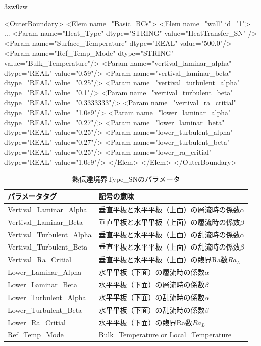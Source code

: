\begin{indentation}{3zw}{0zw}
{\small
\begin{program}
<OuterBoundary>
  <Elem name="Basic_BCs">
    <Elem name="wall" id="1">
      ...
      <Param name="Heat_Type"                dtype="STRING" value="HeatTransfer_SN" />
      <Param name="Surface_Temperature"      dtype="REAL"   value="500.0"/>
      <Param name="Ref_Temp_Mode"            dtype="STRING" value="Bulk_Temperature"/>
      <Param name="vertival_laminar_alpha"   dtype="REAL"   value="0.59"/>
      <Param name="vertival_laminar_beta"    dtype="REAL"   value="0.25"/>
      <Param name="vertival_turbulent_alpha" dtype="REAL"   value="0.1"/>
      <Param name="vertival_turbulent_beta"  dtype="REAL"   value="0.3333333"/>
      <Param name="vertival_ra_critial"      dtype="REAL"   value="1.0e9"/>
      <Param name="lower_laminar_alpha"      dtype="REAL"   value="0.27"/>
      <Param name="lower_laminar_beta"       dtype="REAL"   value="0.25"/>
      <Param name="lower_turbulent_alpha"    dtype="REAL"   value="0.27"/>
      <Param name="lower_turbulent_beta"     dtype="REAL"   value="0.25"/>
      <Param name="lower_ra_critial"         dtype="REAL"   value="1.0e9"/>
    </Elem>
  </Elem>
</OuterBoundary>
\end{program}
}

\begin{table}[htdp]
\caption{熱伝達境界Type\_SNのパラメータ}
\begin{center}
\small
\begin{tabular}{ll}\toprule
パラメータタグ & 記号の意味\\ \midrule
Vertival\_Laminar\_Alpha & 垂直平板と水平平板（上面）の層流時の係数$\alpha$\\
Vertival\_Laminar\_Beta & 垂直平板と水平平板（上面）の層流時の係数$\beta$\\
Vertival\_Turbulent\_Alpha & 垂直平板と水平平板（上面）の乱流時の係数$\alpha$\\
Vertival\_Turbulent\_Beta & 垂直平板と水平平板（上面）の乱流時の係数$\beta$\\
Vertival\_Ra\_Critial & 垂直平板と水平平板（上面）の臨界Ra数$Ra_L$\\
Lower\_Laminar\_Alpha & 水平平板（下面）の層流時の係数$\alpha$\\
Lower\_Laminar\_Beta & 水平平板（下面）の層流時の係数$\beta$\\
Lower\_Turbulent\_Alpha & 水平平板（下面）の乱流時の係数$\alpha$\\
Lower\_Turbulent\_Beta & 水平平板（下面）の乱流時の係数$\beta$\\
Lower\_Ra\_Critial & 水平平板（下面）の臨界Ra数$Ra_L$\\ 
Ref\_Temp\_Mode & Bulk\_Temperature or Local\_Temperature\\ \bottomrule
\end{tabular}
\end{center}
\label{tbl:htsn}
\end{table}



\end{indentation}
